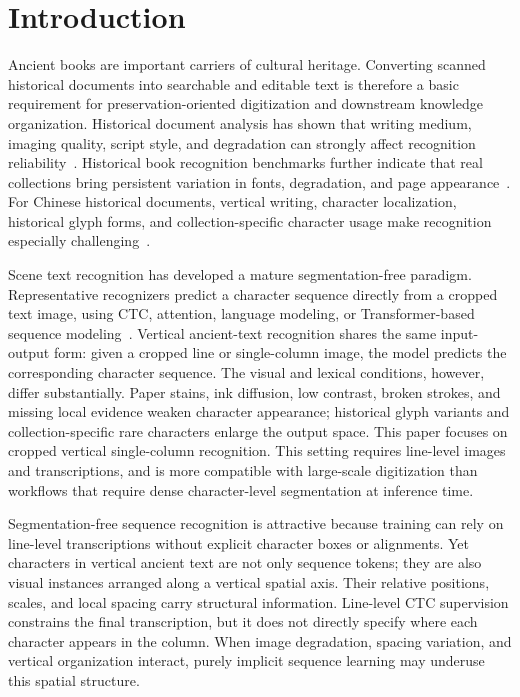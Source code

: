 \section{Introduction}

Ancient books are important carriers of cultural heritage. Converting scanned historical documents into searchable and editable text is therefore a basic requirement for preservation-oriented digitization and downstream knowledge organization. Historical document analysis has shown that writing medium, imaging quality, script style, and degradation can strongly affect recognition reliability~\cite{lombardi2020historicalsurvey}. Historical book recognition benchmarks further indicate that real collections bring persistent variation in fonts, degradation, and page appearance~\cite{antonacopoulos2013hbr}. For Chinese historical documents, vertical writing, character localization, historical glyph forms, and collection-specific character usage make recognition especially challenging~\cite{tang2020hrcenternet,wu2020precise,ma2024reading}.

Scene text recognition has developed a mature segmentation-free paradigm. Representative recognizers predict a character sequence directly from a cropped text image, using CTC, attention, language modeling, or Transformer-based sequence modeling~\cite{shi2017crnn,shi2016rare,baek2019wrong,fang2021abinet,du2022svtr,bautista2022parseq}. Vertical ancient-text recognition shares the same input-output form: given a cropped line or single-column image, the model predicts the corresponding character sequence. The visual and lexical conditions, however, differ substantially. Paper stains, ink diffusion, low contrast, broken strokes, and missing local evidence weaken character appearance; historical glyph variants and collection-specific rare characters enlarge the output space. This paper focuses on cropped vertical single-column recognition. This setting requires line-level images and transcriptions, and is more compatible with large-scale digitization than workflows that require dense character-level segmentation at inference time.

Segmentation-free sequence recognition is attractive because training can rely on line-level transcriptions without explicit character boxes or alignments. Yet characters in vertical ancient text are not only sequence tokens; they are also visual instances arranged along a vertical spatial axis. Their relative positions, scales, and local spacing carry structural information. Line-level CTC supervision constrains the final transcription, but it does not directly specify where each character appears in the column. When image degradation, spacing variation, and vertical organization interact, purely implicit sequence learning may underuse this spatial structure.

